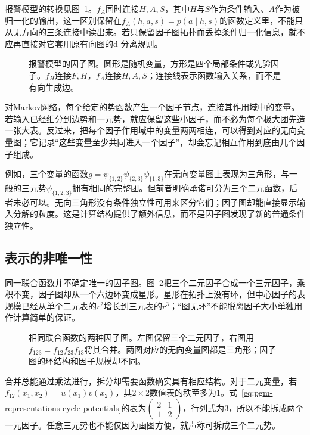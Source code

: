 报警模型的转换见图~\ref{fig:pgm-representations-alarm-factor-graph}。$f_A$同时连接$H,A,S$，其中$H$与$S$作为条件输入、$A$作为被归一化的输出，这一区别保留在$f_A(h,a,s)=p(a\mid h,s)$的函数定义里，不能只从无方向的三条连接中读出来。若只保留因子图拓扑而丢掉条件归一化信息，就不应再直接对它套用原有向图的d-分离规则。

\begin{figure}[htbp]
  \centering
  
  \caption{报警模型的因子图。圆形是随机变量，方形是四个局部条件或先验因子。$f_H$连接$F,H$，$f_A$连接$H,A,S$；连接线表示函数输入关系，而不是有向生成边。}
  \label{fig:pgm-representations-alarm-factor-graph}
\end{figure}

对Markov网络，每个给定的势函数产生一个因子节点，连接其作用域中的变量。若输入已经细分到边势和一元势，就应保留这些小因子，而不必为每个极大团先造一张大表。反过来，把每个因子作用域中的变量两两相连，可以得到对应的无向变量图；它记录“这些变量至少共同进入一个因子”，却会忘记相互作用到底由几个因子组成。

例如，三个变量的函数$g=\psi_{\{1,2\}}\psi_{\{2,3\}}\psi_{\{1,3\}}$在无向变量图上表现为三角形，与一般的三元势$\psi_{\{1,2,3\}}$拥有相同的完整团。但前者明确承诺可分为三个二元函数，后者未必可以。无向三角形没有条件独立性可用来区分它们；因子图却能直接显示输入分解的粒度。这是计算结构提供了额外信息，而不是因子图发现了新的普通条件独立性。

\subsection{表示的非唯一性}
\label{sec:pgm-representations-nonuniqueness}

同一联合函数并不确定唯一的因子图。图~\ref{fig:pgm-representations-factor-grouping}把三个二元因子合成一个三元因子，乘积不变，因子图却从一个六边环变成星形。星形在拓扑上没有环，但中心因子的表规模已经从单个二元表的$r^2$增长到三元表的$r^3$；“图无环”不能脱离因子大小单独用作计算简单的保证。

\begin{figure}[htbp]
  \centering
  
  \caption{相同联合函数的两种因子图。左图保留三个二元因子，右图用$f_{123}=f_{12}f_{23}f_{13}$将其合并。两图对应的无向变量图都是三角形；因子图的环结构和因子规模却不同。}
  \label{fig:pgm-representations-factor-grouping}
\end{figure}

合并总能通过乘法进行，拆分却需要函数确实具有相应结构。对于二元变量，若$f_{12}(x_1,x_2)=u(x_1)v(x_2)$，其$2\times2$数值表的秩至多为$1$。式~\eqref{eq:pgm-representations-cycle-potentials}的表为$\left(\begin{smallmatrix}2&1\\1&2\end{smallmatrix}\right)$，行列式为$3$，所以不能拆成两个一元因子。任意三元势也不能仅因为画图方便，就声称可拆成三个二元势。

